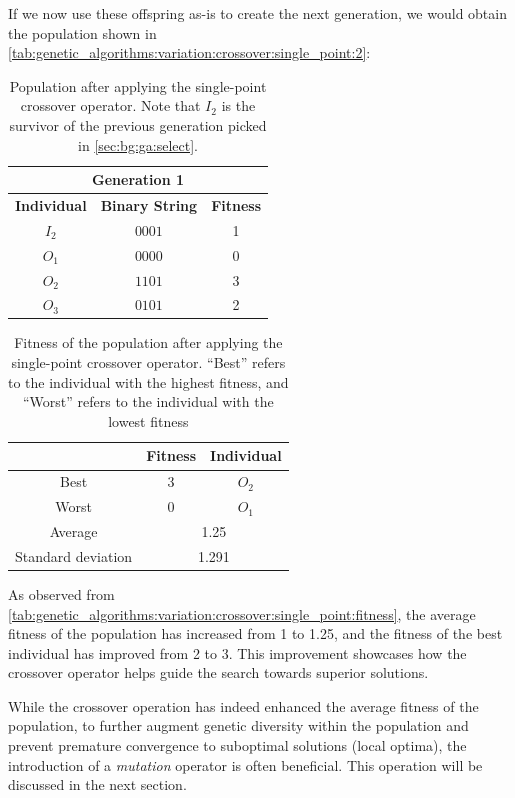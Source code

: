   If we now use these offspring as-is to create the next generation, we would obtain the
  population shown in \vref{tab:genetic_algorithms:variation:crossover:single_point:2}:

  \begin{table}[ht!]
    \centering
    \begin{tabular}{c | c | c }
      \multicolumn{3}{c}{\textbf{Generation 1}} \\
      \hline
      \hline
      \textbf{Individual} & \textbf{Binary String}  & \textbf{Fitness} \\
      \hline
      \(I_2\)             & \(0001\)                & 1 \\
      \(O_1\)             & \(0000\)                & 0 \\
      \(O_2\)             & \(1101\)                & 3 \\
      \(O_3\)             & \(0101\)                & 2
    \end{tabular}
    \caption{
      Population after applying the single-point crossover operator.
      Note that \(I_2\) is the survivor of the previous generation picked in 
      \vref{sec:bg:ga:select}.
    }
    \label{tab:genetic_algorithms:variation:crossover:single_point:2}
  \end{table}

  \begin{table}[H]
    \centering
    \begin{tabular}{|c|c|c|}
      \hline
            & \textbf{Fitness} & \textbf{Individual}  \\
      \hline
      Best  & 3 & \(O_2\) \\
      Worst & 0 & \(O_1\) \\
      \hline
      \hline
      Average & \multicolumn{2}{c|}{1.25} \\
      \hline
      Standard deviation & \multicolumn{2}{c|}{1.291} \\
      \hline
    \end{tabular}
    \caption{
      Fitness of the population after applying the single-point crossover operator.
      \enquote{Best} refers to the individual with the highest fitness, and \enquote{Worst} refers 
      to the individual with the lowest fitness
    }
    \label{tab:genetic_algorithms:variation:crossover:single_point:fitness}
  \end{table}

  As observed from \vref{tab:genetic_algorithms:variation:crossover:single_point:fitness}, the 
  average fitness of the population has increased from 1 to 1.25, and the fitness of the best 
  individual has improved from 2 to 3. 
  This improvement showcases how the crossover operator helps guide the search towards superior 
  solutions.

  While the crossover operation has indeed enhanced the average fitness of the population, to 
  further augment genetic diversity within the population and prevent premature convergence to 
  suboptimal solutions (local optima), the introduction of a \emph{mutation} operator is often 
  beneficial. 
  This operation will be discussed in the next section.

